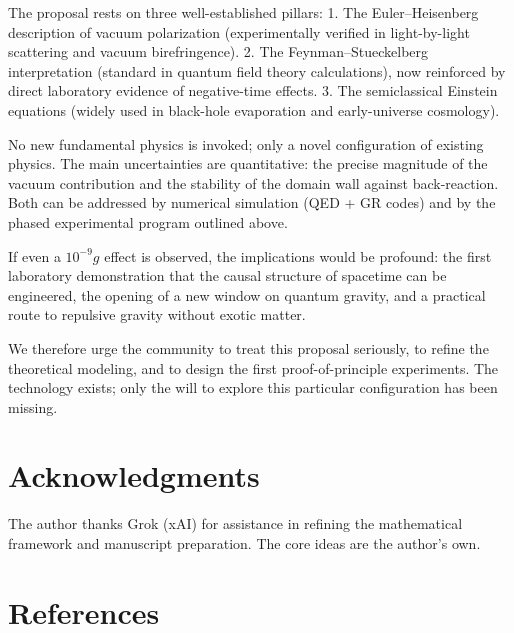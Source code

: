 \documentclass[11pt,a4paper]{article}
\begin{document}
The proposal rests on three well-established pillars:
1. The Euler--Heisenberg description of vacuum polarization (experimentally verified in light-by-light scattering and vacuum birefringence).
2. The Feynman--Stueckelberg interpretation (standard in quantum field theory calculations), now reinforced by direct laboratory evidence of negative-time effects.
3. The semiclassical Einstein equations (widely used in black-hole evaporation and early-universe cosmology).

No new fundamental physics is invoked; only a novel configuration of existing physics. The main uncertainties are quantitative: the precise magnitude of the vacuum contribution and the stability of the domain wall against back-reaction. Both can be addressed by numerical simulation (QED + GR codes) and by the phased experimental program outlined above.

If even a $10^{-9} g$ effect is observed, the implications would be profound: the first laboratory demonstration that the causal structure of spacetime can be engineered, the opening of a new window on quantum gravity, and a practical route to repulsive gravity without exotic matter.

We therefore urge the community to treat this proposal seriously, to refine the theoretical modeling, and to design the first proof-of-principle experiments. The technology exists; only the will to explore this particular configuration has been missing.

\section*{Acknowledgments}
The author thanks Grok (xAI) for assistance in refining the mathematical framework and manuscript preparation. The core ideas are the author's own.

\section*{References}
\end{document}
